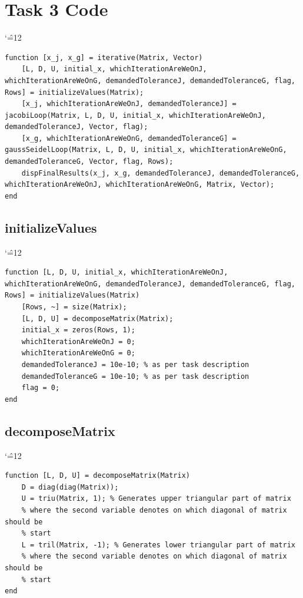 \documentclass[12pt]{report}
\newenvironment{simplechar}{%
   \catcode`\^=12
}{}
\begin{document}
\section{Task 3 Code}
\begin{simplechar}
\begin{lstlisting}
function [x_j, x_g] = iterative(Matrix, Vector)
    [L, D, U, initial_x, whichIterationAreWeOnJ, whichIterationAreWeOnG, demandedToleranceJ, demandedToleranceG, flag, Rows] = initializeValues(Matrix);
    [x_j, whichIterationAreWeOnJ, demandedToleranceJ] = jacobiLoop(Matrix, L, D, U, initial_x, whichIterationAreWeOnJ, demandedToleranceJ, Vector, flag);
    [x_g, whichIterationAreWeOnG, demandedToleranceG] = gaussSeidelLoop(Matrix, L, D, U, initial_x, whichIterationAreWeOnG, demandedToleranceG, Vector, flag, Rows);
    dispFinalResults(x_j, x_g, demandedToleranceJ, demandedToleranceG, whichIterationAreWeOnJ, whichIterationAreWeOnG, Matrix, Vector);
end

\end{lstlisting}
\end{simplechar}

\newpage
\subsection{initializeValues}
\begin{simplechar}
\begin{lstlisting}
function [L, D, U, initial_x, whichIterationAreWeOnJ, whichIterationAreWeOnG, demandedToleranceJ, demandedToleranceG, flag, Rows] = initializeValues(Matrix)
    [Rows, ~] = size(Matrix);
    [L, D, U] = decomposeMatrix(Matrix);
    initial_x = zeros(Rows, 1);
    whichIterationAreWeOnJ = 0;
    whichIterationAreWeOnG = 0;
    demandedToleranceJ = 10e-10; % as per task description
    demandedToleranceG = 10e-10; % as per task description
    flag = 0;
end
\end{lstlisting}
\end{simplechar}

\subsection{decomposeMatrix}
\begin{simplechar}
\begin{lstlisting}
function [L, D, U] = decomposeMatrix(Matrix)
    D = diag(diag(Matrix));
    U = triu(Matrix, 1); % Generates upper triangular part of matrix
    % where the second variable denotes on which diagonal of matrix should be
    % start
    L = tril(Matrix, -1); % Generates lower triangular part of matrix
    % where the second variable denotes on which diagonal of matrix should be
    % start
end
\end{lstlisting}
\end{simplechar}
\end{document}
